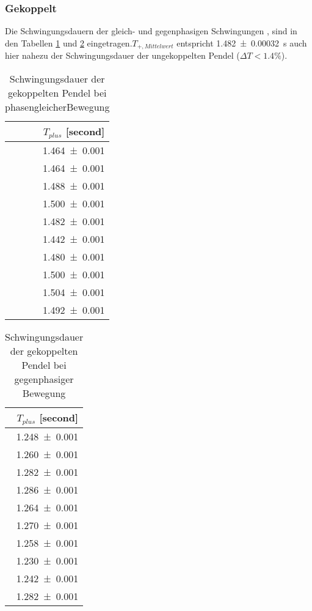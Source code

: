 \subsubsection{Gekoppelt}
Die Schwingungsdauern der gleich- und gegenphasigen Schwingungen
, sind in den Tabellen \ref{tab:l2t+} und \ref{tab:l2t-}
eingetragen.$T_{+,Mittelwert}$ entspricht
\SI{1.482+-0.00032}{\second} auch hier nahezu der Schwingungsdauer
der ungekoppelten Pendel ($\Delta T < \num{1.4}\%$).
\begin{table}[H]
 \centering
 \caption{Schwingungsdauer der gekoppelten
 Pendel bei phasengleicherBewegung}
 \label{tab:l2t+}
 \begin{tabular}{r}
 \toprule
  {$T_{plus}$ [\si{second}]} \\
 \midrule
    \num{1.464 +- 0.001}\\
    \num{1.464 +- 0.001}\\
    \num{1.488 +- 0.001}\\
    \num{1.500 +- 0.001}\\
    \num{1.482 +- 0.001}\\
    \num{1.442 +- 0.001}\\
    \num{1.480 +- 0.001}\\
    \num{1.500 +- 0.001}\\
    \num{1.504 +- 0.001}\\
    \num{1.492 +- 0.001}\\
 \bottomrule
 \end{tabular}
\end{table}

\begin{table}[H]
 \centering
 \caption{Schwingungsdauer der gekoppelten
 Pendel bei gegenphasiger Bewegung}
 \label{tab:l2t-}
 \begin{tabular}{r}
 \toprule
  {$T_{plus}$ [\si{second}]} \\
 \midrule
    \num{1.248 +- 0.001}\\
    \num{1.260 +- 0.001}\\
    \num{1.282 +- 0.001}\\
    \num{1.286 +- 0.001}\\
    \num{1.264 +- 0.001}\\
    \num{1.270 +- 0.001}\\
    \num{1.258 +- 0.001}\\
    \num{1.230 +- 0.001}\\
    \num{1.242 +- 0.001}\\
    \num{1.282 +- 0.001}\\
 \bottomrule
 \end{tabular}
\end{table}

